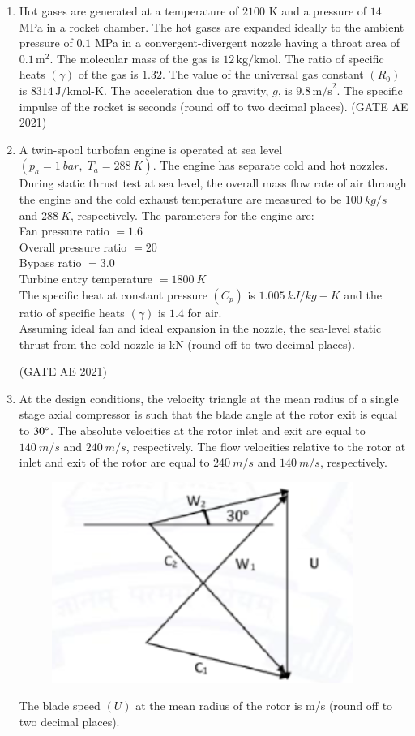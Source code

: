 \documentclass[journal,12pt,onecolumn]{IEEEtran}
\theoremstyle{remark}
\begin{document}
\begin{flushleft}
\begin{enumerate}
\item 
Hot gases are generated at a temperature of $2100$ K and a pressure of $14$ MPa in a rocket chamber. The hot gases are expanded ideally to the ambient pressure of $0.1$ MPa in a convergent-divergent nozzle having a throat area of $0.1 \,\text{m}^2$. The molecular mass of the gas is $12 \,\text{kg/kmol}$. The ratio of specific heats $(\gamma)$ of the gas is $1.32$. The value of the universal gas constant $(R_0)$ is $8314 \,\text{J/kmol-K}$. The acceleration due to gravity, $g$, is $9.8 \,\text{m/s}^2$. The specific impulse of the rocket is \underline{\hfill} seconds (round off to two decimal places).  
\hfill (GATE AE 2021)

\item 
A twin-spool turbofan engine is operated at sea level $(p_a = 1~bar,\; T_a = 288~K)$. The engine has separate cold and hot nozzles. During static thrust test at sea level, the overall mass flow rate of air through the engine and the cold exhaust temperature are measured to be $100~kg/s$ and $288~K$, respectively. The parameters for the engine are: \\
Fan pressure ratio $= 1.6$ \\
Overall pressure ratio $= 20$ \\
Bypass ratio $= 3.0$ \\
Turbine entry temperature $= 1800~K$ \\
The specific heat at constant pressure $(C_p)$ is $1.005~kJ/kg-K$ and the ratio of specific heats $(\gamma)$ is $1.4$ for air. \\
Assuming ideal fan and ideal expansion in the nozzle, the sea-level static thrust from the cold nozzle is \underline{\hspace{2cm}} kN (round off to two decimal places).  

\hfill (GATE AE 2021)

\item 
At the design conditions, the velocity triangle at the mean radius of a single stage axial compressor is such that the blade angle at the rotor exit is equal to $30\degree$. The absolute velocities at the rotor inlet and exit are equal to $140~m/s$ and $240~m/s$, respectively. The flow velocities relative to the rotor at inlet and exit of the rotor are equal to $240~m/s$ and $140~m/s$, respectively.  
\begin{figure}[H]
    \centering
    \includegraphics[width=0.5\columnwidth]{figs/46.png}
    \caption{}
    \label{fig:placeholder}
\end{figure}
The blade speed $(U)$ at the mean radius of the rotor is \underline{\hspace{2cm}} m/s (round off to two decimal places).  


\end{enumerate}
\end{flushleft}
\end{document}
